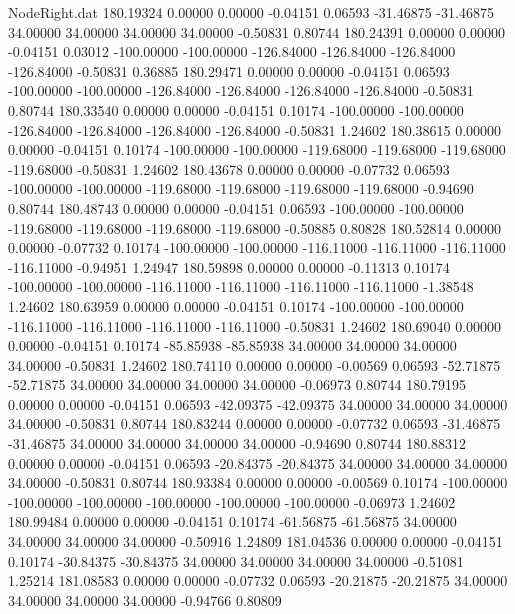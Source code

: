 \begin{filecontents}{NodeRight.dat}
 180.19324    0.00000    0.00000    -0.04151    0.06593  -31.46875  -31.46875   34.00000   34.00000   34.00000   34.00000   -0.50831    0.80744
 180.24391    0.00000    0.00000    -0.04151    0.03012 -100.00000 -100.00000 -126.84000 -126.84000 -126.84000 -126.84000   -0.50831    0.36885
 180.29471    0.00000    0.00000    -0.04151    0.06593 -100.00000 -100.00000 -126.84000 -126.84000 -126.84000 -126.84000   -0.50831    0.80744
 180.33540    0.00000    0.00000    -0.04151    0.10174 -100.00000 -100.00000 -126.84000 -126.84000 -126.84000 -126.84000   -0.50831    1.24602
 180.38615    0.00000    0.00000    -0.04151    0.10174 -100.00000 -100.00000 -119.68000 -119.68000 -119.68000 -119.68000   -0.50831    1.24602
 180.43678    0.00000    0.00000    -0.07732    0.06593 -100.00000 -100.00000 -119.68000 -119.68000 -119.68000 -119.68000   -0.94690    0.80744
 180.48743    0.00000    0.00000    -0.04151    0.06593 -100.00000 -100.00000 -119.68000 -119.68000 -119.68000 -119.68000   -0.50885    0.80828
 180.52814    0.00000    0.00000    -0.07732    0.10174 -100.00000 -100.00000 -116.11000 -116.11000 -116.11000 -116.11000   -0.94951    1.24947
 180.59898    0.00000    0.00000    -0.11313    0.10174 -100.00000 -100.00000 -116.11000 -116.11000 -116.11000 -116.11000   -1.38548    1.24602
 180.63959    0.00000    0.00000    -0.04151    0.10174 -100.00000 -100.00000 -116.11000 -116.11000 -116.11000 -116.11000   -0.50831    1.24602
 180.69040    0.00000    0.00000    -0.04151    0.10174  -85.85938  -85.85938   34.00000   34.00000   34.00000   34.00000   -0.50831    1.24602
 180.74110    0.00000    0.00000    -0.00569    0.06593  -52.71875  -52.71875   34.00000   34.00000   34.00000   34.00000   -0.06973    0.80744
 180.79195    0.00000    0.00000    -0.04151    0.06593  -42.09375  -42.09375   34.00000   34.00000   34.00000   34.00000   -0.50831    0.80744
 180.83244    0.00000    0.00000    -0.07732    0.06593  -31.46875  -31.46875   34.00000   34.00000   34.00000   34.00000   -0.94690    0.80744
 180.88312    0.00000    0.00000    -0.04151    0.06593  -20.84375  -20.84375   34.00000   34.00000   34.00000   34.00000   -0.50831    0.80744
 180.93384    0.00000    0.00000    -0.00569    0.10174 -100.00000 -100.00000 -100.00000 -100.00000 -100.00000 -100.00000   -0.06973    1.24602
 180.99484    0.00000    0.00000    -0.04151    0.10174  -61.56875  -61.56875   34.00000   34.00000   34.00000   34.00000   -0.50916    1.24809
 181.04536    0.00000    0.00000    -0.04151    0.10174  -30.84375  -30.84375   34.00000   34.00000   34.00000   34.00000   -0.51081    1.25214
 181.08583    0.00000    0.00000    -0.07732    0.06593  -20.21875  -20.21875   34.00000   34.00000   34.00000   34.00000   -0.94766    0.80809

\end{filecontents}
